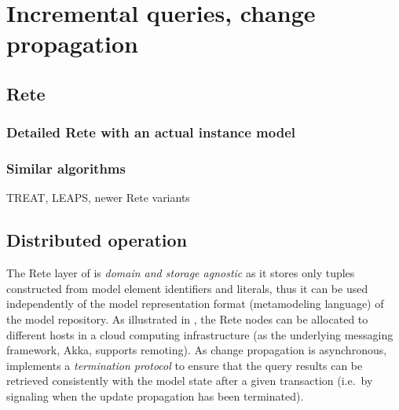 \section{Incremental queries, change propagation}
\label{sec:incrementality}



\subsection{Rete}




\subsubsection{Detailed Rete with an actual instance model}





\subsubsection{Similar algorithms}

TREAT, LEAPS, newer Rete variants


\subsection{Distributed operation}


The Rete layer of \iqd{} is \emph{domain and storage agnostic} as it stores only tuples constructed from model element identifiers and literals, thus it can be used independently of the model representation format (metamodeling language) of the model repository.
As illustrated in , the Rete nodes can be allocated to different hosts in a cloud computing infrastructure (as the underlying messaging framework, Akka, supports remoting). As change propagation is asynchronous, \iqd{} implements a \emph{termination protocol} to ensure that the query results can be retrieved consistently with the model state after a given transaction (i.e.\ by signaling when the update propagation has been terminated).






